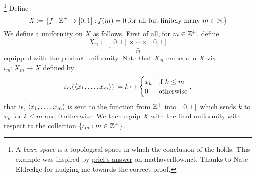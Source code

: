 \begin{exm}\begin{savenotes}\footnote{A \emph{baire space} is a topological space in which the conclusion of the  holds.  This example was inspired by \href{http://mathoverflow.net/questions/212308/baire-category-theorem-for-complete-uniform-spaces}{priel's answer} on mathoverflow.net.  Thanks to Nate Eldredge for nudging me towards the correct proof.}\label{exm4.5.2x}
Define
\begin{equation}
X\coloneqq \{ f:\mathbb{Z} ^+ \rightarrow [0,1] :f(m)=0\text{ for all but finitely many }m\in \mathbb{N} \text{.}\} 
\end{equation}
We define a uniformity on $X$ as follows.  First of all, for $m\in \mathbb{Z} ^+$, define
\begin{equation}
X_m\coloneqq \underbrace{[0,1] \times \cdots \times [0,1]}_{m}
\end{equation}
equipped with the product uniformity.  Note that $X_m$ embeds in $X$ via $\iota _m:X_m\rightarrow X$ defined by
\begin{equation}
\iota _m(\langle x_1,\ldots ,x_m\rangle)\coloneqq k\mapsto \begin{cases}x_k & \text{if }k\leq m \\ 0 & \text{otherwise}\end{cases},
\end{equation}
that is, $\langle x_1,\ldots ,x_m\rangle$ is sent to the function from $\mathbb{Z} ^+$ into $[0,1]$ which sends $k$ to $x_k$ for $k\leq m$ and $0$ otherwise.  We then equip $X$ with the final uniformity with respect to the collection $\{ \iota _m:m\in \mathbb{Z} ^+\}$.


\end{savenotes}
\end{exm}
